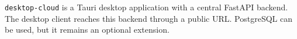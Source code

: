 \begin{beginnerstatement}

\texttt{desktop-cloud} is a Tauri desktop application with a central FastAPI
backend. The desktop client reaches this backend through a public URL.
PostgreSQL can be used, but it remains an optional extension.

\end{beginnerstatement}
